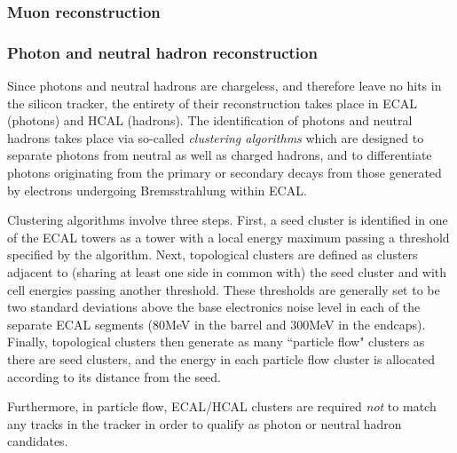 \subsubsection{Muon reconstruction}


\subsubsection{Photon and neutral hadron reconstruction}

Since photons and neutral hadrons are chargeless, and therefore leave no hits in the silicon tracker, the entirety of their reconstruction takes place in ECAL (photons) and HCAL (hadrons). The identification of photons and neutral hadrons takes place via so-called \emph{clustering algorithms} which are designed to separate photons from neutral as well as charged hadrons, and to differentiate photons originating from the primary or secondary decays from those generated by electrons undergoing Bremsstrahlung within ECAL.

Clustering algorithms involve three steps. First, a seed cluster is identified in one of the ECAL towers as a tower with a local energy maximum passing a threshold specified by the algorithm. Next, topological clusters are defined as clusters adjacent to (sharing at least one side in common with) the seed cluster and with cell energies passing another threshold. These thresholds are generally set to be two standard deviations above the base electronics noise level in each of the separate ECAL segments (80MeV in the barrel and 300MeV in the endcaps). Finally, topological clusters then generate as many ``particle flow" clusters as there are seed clusters, and the energy in each particle flow cluster is allocated according to its distance from the seed. 

Furthermore, in particle flow, ECAL/HCAL clusters are required \emph{not} to match any tracks in the tracker in order to qualify as photon or neutral hadron candidates.





